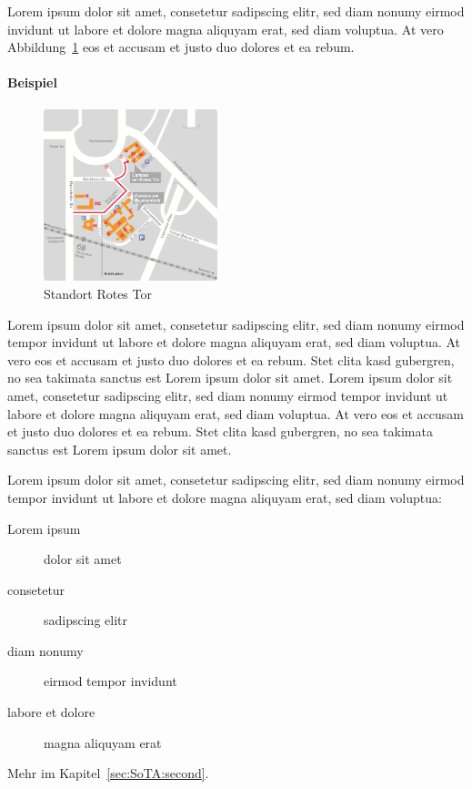 Lorem ipsum dolor sit amet, consetetur sadipscing elitr, sed diam nonumy eirmod  invidunt ut labore et dolore magna aliquyam erat, sed diam voluptua. At vero Abbildung~\ref{fig:standort_rotes_tor_anfahrt_klm_bau} eos et accusam et justo duo dolores et ea rebum.

\paragraph*{Beispiel}

\begin{figure}
  \vspace{-20pt}
  \begin{center}
    \includegraphics[width=0.45\textwidth]{./images/standort_rotes_tor_anfahrt_klm_bau.png}
  \end{center}
  \vspace{-20pt}
  \caption[Standort Rotes Tor]{Standort Rotes Tor \cite{HSA.2013}}
  \label{fig:standort_rotes_tor_anfahrt_klm_bau}
  \vspace{-10pt}
\end{figure}

Lorem ipsum dolor sit amet, consetetur sadipscing elitr, sed diam nonumy eirmod tempor invidunt ut labore et dolore magna aliquyam erat, sed diam voluptua. At vero eos et accusam et justo duo dolores et ea rebum. Stet clita kasd gubergren, no sea takimata sanctus est Lorem ipsum dolor sit amet. Lorem ipsum dolor sit amet, consetetur sadipscing elitr, sed diam nonumy eirmod tempor invidunt ut labore et dolore magna aliquyam erat, sed diam voluptua. At vero eos et accusam et justo duo dolores et ea rebum. Stet clita kasd gubergren, no sea takimata sanctus est Lorem ipsum dolor sit amet.

\begin{samepage}
  Lorem ipsum dolor sit amet, consetetur sadipscing elitr, sed diam nonumy eirmod tempor invidunt ut labore et dolore magna aliquyam erat, sed diam voluptua:
  \begin{description}
    \item[Lorem ipsum] dolor sit amet
    \item[consetetur] sadipscing elitr
    \item[diam nonumy] eirmod tempor invidunt
    \item[labore et dolore] magna aliquyam erat
  \end{description}
\end{samepage}

Mehr im Kapitel~\ref{sec:SoTA:second}.